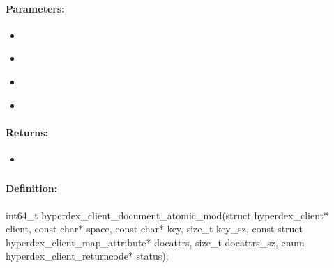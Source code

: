 \paragraph{Parameters:}
\begin{itemize}[noitemsep]
\item {}\\

\item {}\\

\item {}\\

\item {}\\

\end{itemize}

\paragraph{Returns:}
\begin{itemize}[noitemsep]
\item {}\\

\end{itemize}

\pagebreak
\subsubsection{}
\label{api:c:document_atomic_mod}


\paragraph{Definition:}
\begin{ccode}
int64_t hyperdex_client_document_atomic_mod(struct hyperdex_client* client,
        const char* space,
        const char* key, size_t key_sz,
        const struct hyperdex_client_map_attribute* docattrs, size_t docattrs_sz,
        enum hyperdex_client_returncode* status);
\end{ccode}

